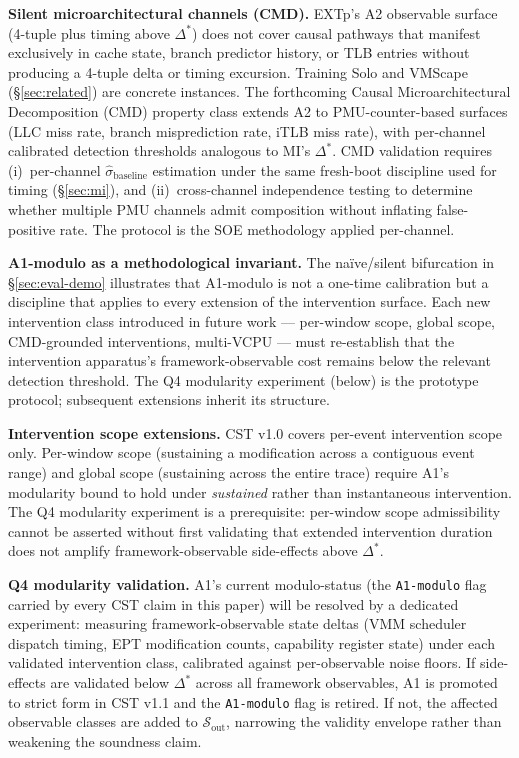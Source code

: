 \documentclass[conference]{IEEEtran}
\newcommand{\sigbase}{\hat{\sigma}_\text{baseline}}
\newcommand{\Dstar}{\Delta^{*}}
\begin{document}
\textbf{Silent microarchitectural channels (CMD).} EXTp's A2
observable surface (4-tuple plus timing above $\Dstar$) does not
cover causal pathways that manifest exclusively in cache state,
branch predictor history, or TLB entries without producing a
4-tuple delta or timing excursion. Training Solo and VMScape
(\S\ref{sec:related}) are concrete instances. The forthcoming
Causal Microarchitectural Decomposition (CMD) property class
extends A2 to PMU-counter-based surfaces (LLC miss rate, branch
misprediction rate, iTLB miss rate), with per-channel calibrated
detection thresholds analogous to MI's $\Dstar$. CMD validation
requires (i)~per-channel $\sigbase$ estimation under the same
fresh-boot discipline used for timing (\S\ref{sec:mi}), and
(ii)~cross-channel independence testing to determine whether
multiple PMU channels admit composition without inflating
false-positive rate. The protocol is the SOE methodology applied
per-channel.

\textbf{A1-modulo as a methodological invariant.} The
naïve/silent bifurcation in \S\ref{sec:eval-demo} illustrates that
A1-modulo is not a one-time calibration but a discipline that
applies to every extension of the intervention surface. Each new
intervention class introduced in future work --- per-window scope,
global scope, CMD-grounded interventions, multi-VCPU --- must
re-establish that the intervention apparatus's framework-observable
cost remains below the relevant detection threshold. The Q4
modularity experiment (below) is the prototype protocol; subsequent
extensions inherit its structure.

\textbf{Intervention scope extensions.} CST v1.0 covers per-event
intervention scope only. Per-window scope (sustaining a modification
across a contiguous event range) and global scope (sustaining
across the entire trace) require A1's modularity bound to hold
under \emph{sustained} rather than instantaneous intervention. The
Q4 modularity experiment is a prerequisite: per-window scope
admissibility cannot be asserted without first validating that
extended intervention duration does not amplify framework-observable
side-effects above $\Dstar$.

\textbf{Q4 modularity validation.} A1's current modulo-status (the
\texttt{A1-modulo} flag carried by every CST claim in this paper)
will be resolved by a dedicated experiment: measuring
framework-observable state deltas (VMM scheduler dispatch timing,
EPT modification counts, capability register state) under each
validated intervention class, calibrated against per-observable
noise floors. If side-effects are validated below $\Dstar$ across
all framework observables, A1 is promoted to strict form in CST
v1.1 and the \texttt{A1-modulo} flag is retired. If not, the
affected observable classes are added to
$\mathcal{S}_\text{out}$, narrowing the validity envelope rather
than weakening the soundness claim.
\end{document}
